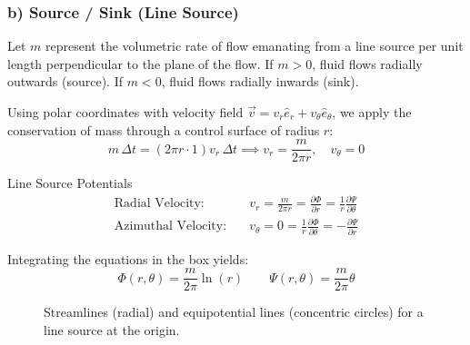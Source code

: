 \subsubsection{b) Source / Sink (Line Source)}

Let $m$ represent the volumetric rate of flow emanating from a line source per unit length perpendicular to the plane of the flow. If $m > 0$, fluid flows radially outwards (source). If $m < 0$, fluid flows radially inwards (sink).

Using polar coordinates with velocity field $\vec{v} = v_r \hat{e}_r + v_\theta \hat{e}_\theta$, we apply the conservation of mass through a control surface of radius $r$:
$$m \, \Delta t = (2\pi r \cdot 1) v_r \, \Delta t \implies v_r = \frac{m}{2\pi r}, \quad v_\theta = 0$$

\begin{eqbox}{Line Source Potentials}
\begin{align*}
\text{Radial Velocity:} \quad & v_r = \frac{m}{2\pi r} = \frac{\partial \Phi}{\partial r} = \frac{1}{r}\frac{\partial \Psi}{\partial \theta} \\
\text{Azimuthal Velocity:} \quad & v_\theta = 0 = \frac{1}{r}\frac{\partial \Phi}{\partial \theta} = -\frac{\partial \Psi}{\partial r}
\end{align*}
\end{eqbox}

Integrating the equations in the box yields:
$$\Phi(r, \theta) = \frac{m}{2\pi} \ln(r) \qquad \Psi(r, \theta) = \frac{m}{2\pi} \theta$$

\begin{figure}[htbp]
\centering
{}
\caption{Streamlines (radial) and equipotential lines (concentric circles) for a line source at the origin.}
\label{fig:source_flow}
\end{figure}

